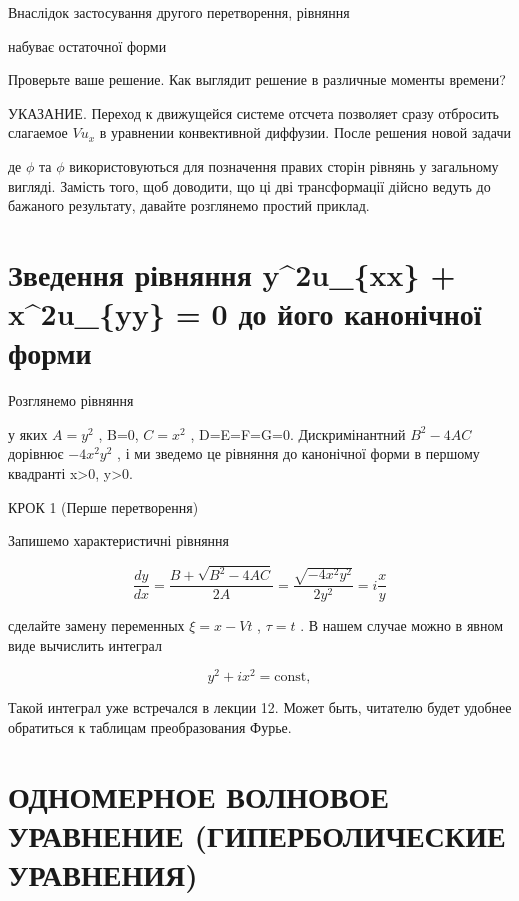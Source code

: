 \documentclass[
  ukrainian,
]{article}
\begin{document}
Внаслідок застосування другого перетворення, рівняння

набуває остаточної форми

Проверьте ваше решение. Как выглядит решение в различные моменты
времени?

УКАЗАНИЕ. Переход к движущейся системе отсчета позволяет сразу отбросить
слагаемое \(Vu_x\) в уравнении конвективной диффузии. После решения
новой задачи

де \(\phi\) та \(\phi\) використовуються для позначення правих сторін
рівнянь у загальному вигляді. Замість того, щоб доводити, що ці дві
трансформації дійсно ведуть до бажаного результату, давайте розглянемо
простий приклад.

\section{Зведення рівняння y\^{}2u\_\{xx\} + x\^{}2u\_\{yy\} = 0 до його
канонічної
форми}\label{ux437ux432ux435ux434ux435ux43dux43dux44f-ux440ux456ux432ux43dux44fux43dux43dux44f-y2u_xx-x2u_yy-0-ux434ux43e-ux439ux43eux433ux43e-ux43aux430ux43dux43eux43dux456ux447ux43dux43eux457-ux444ux43eux440ux43cux438}

Розглянемо рівняння

у яких \(A=y^2\) , B=0, \(C=x^2\) , D=E=F=G=0. Дискримінантний
\(B^2-4AC\) дорівнює \(-4x^2y^2\) , і ми зведемо це рівняння до
канонічної форми в першому квадранті x\textgreater0, y\textgreater0.

КРОК 1 (Перше перетворення)

Запишемо характеристичні рівняння

\[
\frac{dy}{dx} = \frac{B + \sqrt{B^2 - 4AC}}{2A} = \frac{\sqrt{-4x^2y^2}}{2y^2} = i\frac{x}{y}
\]

сделайте замену переменных \(\xi = x - Vt\) , \(\tau = t\) . В нашем
случае можно в явном виде вычислить интеграл

\[
y^2 + ix^2 = \text{const},
\]

Такой интеграл уже встречался в лекции 12. Может быть, читателю будет
удобнее обратиться к таблицам преобразования Фурье.

\section{ОДНОМЕРНОЕ ВОЛНОВОЕ УРАВНЕНИЕ (ГИПЕРБОЛИЧЕСКИЕ
УРАВНЕНИЯ)}\label{ux43eux434ux43dux43eux43cux435ux440ux43dux43eux435-ux432ux43eux43bux43dux43eux432ux43eux435-ux443ux440ux430ux432ux43dux435ux43dux438ux435-ux433ux438ux43fux435ux440ux431ux43eux43bux438ux447ux435ux441ux43aux438ux435-ux443ux440ux430ux432ux43dux435ux43dux438ux44f}
\end{document}
